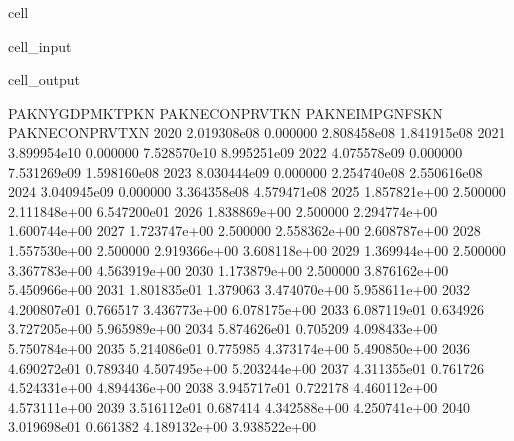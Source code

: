 \documentclass[letterpaper,10pt,english]{jupyterBook}
\begin{document}
\begin{sphinxuseclass}{cell}\begin{sphinxVerbatimInput}

\begin{sphinxuseclass}{cell_input}
\begin{sphinxVerbatim}[commandchars=\\\{\}]
 
    \PYG{p}{[}\PYG{p}{]}
\end{sphinxVerbatim}

\end{sphinxuseclass}\end{sphinxVerbatimInput}
\begin{sphinxVerbatimOutput}

\begin{sphinxuseclass}{cell_output}
\begin{sphinxVerbatim}[commandchars=\\\{\}]
      PAKNYGDPMKTPKN  PAKNECONPRVTKN  PAKNEIMPGNFSKN  PAKNECONPRVTXN
2020    2.019308e\PYGZhy{}08        0.000000    2.808458e\PYGZhy{}08    1.841915e\PYGZhy{}08
2021   \PYGZhy{}3.899954e\PYGZhy{}10        0.000000   \PYGZhy{}7.528570e\PYGZhy{}10    8.995251e\PYGZhy{}09
2022   \PYGZhy{}4.075578e\PYGZhy{}09        0.000000    7.531269e\PYGZhy{}09    1.598160e\PYGZhy{}08
2023    8.030444e\PYGZhy{}09        0.000000    2.254740e\PYGZhy{}08    2.550616e\PYGZhy{}08
2024   \PYGZhy{}3.040945e\PYGZhy{}09        0.000000    3.364358e\PYGZhy{}08    4.579471e\PYGZhy{}08
2025    1.857821e+00        2.500000    2.111848e+00    6.547200e\PYGZhy{}01
2026    1.838869e+00        2.500000    2.294774e+00    1.600744e+00
2027    1.723747e+00        2.500000    2.558362e+00    2.608787e+00
2028    1.557530e+00        2.500000    2.919366e+00    3.608118e+00
2029    1.369944e+00        2.500000    3.367783e+00    4.563919e+00
2030    1.173879e+00        2.500000    3.876162e+00    5.450966e+00
2031    1.801835e\PYGZhy{}01        1.379063    3.474070e+00    5.958611e+00
2032   \PYGZhy{}4.200807e\PYGZhy{}01        0.766517    3.436773e+00    6.078175e+00
2033   \PYGZhy{}6.087119e\PYGZhy{}01        0.634926    3.727205e+00    5.965989e+00
2034   \PYGZhy{}5.874626e\PYGZhy{}01        0.705209    4.098433e+00    5.750784e+00
2035   \PYGZhy{}5.214086e\PYGZhy{}01        0.775985    4.373174e+00    5.490850e+00
2036   \PYGZhy{}4.690272e\PYGZhy{}01        0.789340    4.507495e+00    5.203244e+00
2037   \PYGZhy{}4.311355e\PYGZhy{}01        0.761726    4.524331e+00    4.894436e+00
2038   \PYGZhy{}3.945717e\PYGZhy{}01        0.722178    4.460112e+00    4.573111e+00
2039   \PYGZhy{}3.516112e\PYGZhy{}01        0.687414    4.342588e+00    4.250741e+00
2040   \PYGZhy{}3.019698e\PYGZhy{}01        0.661382    4.189132e+00    3.938522e+00
\end{sphinxVerbatim}


\end{sphinxuseclass}
\end{sphinxVerbatimOutput}
\end{sphinxuseclass}
\end{document}
